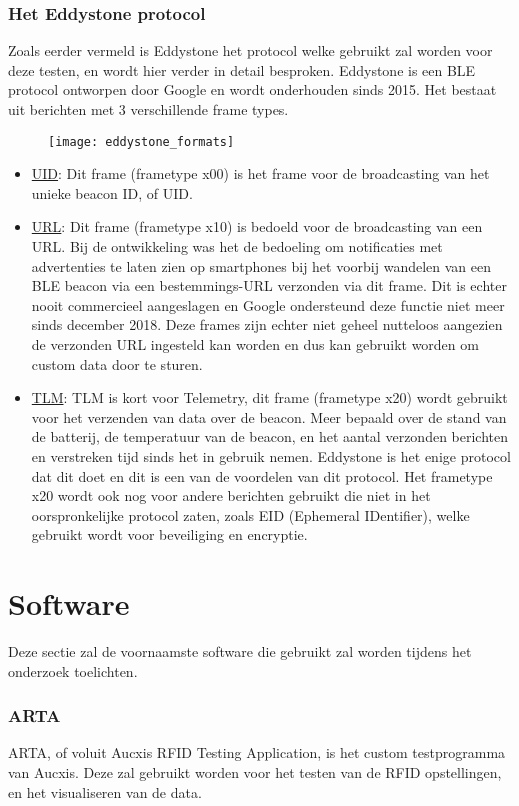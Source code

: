 \subsubsection{Het Eddystone protocol}
Zoals eerder vermeld is Eddystone het protocol welke gebruikt zal worden voor deze testen, en wordt hier verder in detail besproken. Eddystone is een BLE protocol ontworpen door Google en wordt onderhouden sinds 2015. Het bestaat uit berichten met 3 verschillende frame types. 
\begin{figure}[h]
	\texttt{[image: eddystone\_formats]}
	\centering
\end{figure}
\begin{itemize}
	\item \underline{UID}:
	Dit frame (frametype x00) is het frame voor de broadcasting van het unieke beacon ID, of UID.
	\item \underline{URL}:
	Dit frame (frametype x10) is bedoeld voor de broadcasting van een URL. Bij de ontwikkeling was het de bedoeling om notificaties met advertenties te laten zien op smartphones bij het voorbij wandelen van een BLE beacon via een bestemmings-URL verzonden via dit frame. Dit is echter nooit commercieel aangeslagen en Google ondersteund deze functie niet meer sinds december 2018.\autocite{Estimote2018} Deze frames zijn echter niet geheel nutteloos aangezien de verzonden URL ingesteld kan worden en dus kan gebruikt worden om custom data door te sturen.
	\item \underline{TLM}:
	TLM is kort voor Telemetry, dit frame (frametype x20) wordt gebruikt voor het verzenden van data over de beacon. Meer bepaald over de stand van de batterij, de temperatuur van de beacon, en het aantal verzonden berichten en verstreken tijd sinds het in gebruik nemen. Eddystone is het enige protocol dat dit doet en dit is een van de voordelen van dit protocol. Het frametype x20 wordt ook nog voor andere berichten gebruikt die niet in het oorspronkelijke protocol zaten, zoals EID (Ephemeral IDentifier), welke gebruikt wordt voor beveiliging en encryptie.
\end{itemize}\autocite{Google2018}

\section{Software}
\label{sec:Software}
Deze sectie zal de voornaamste software die gebruikt zal worden tijdens het onderzoek toelichten.

\subsubsection{ARTA}
ARTA, of voluit Aucxis RFID Testing Application, is het custom testprogramma van Aucxis. Deze zal gebruikt worden voor het testen van de RFID opstellingen, en het visualiseren van de data.

